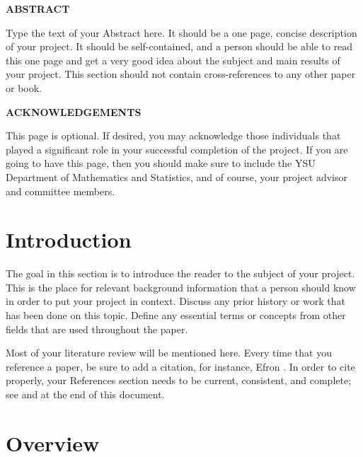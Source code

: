 \documentclass[11pt]{article}
\begin{document}
\newpage
{}
\setcounter{page}{2}
\begin{center}
\textbf{ABSTRACT} 
\end{center} \vspace{0.25in}

Type the text of your Abstract here.  It should be a one page, 
concise description of your project. It should be self-contained, 
and a person should be able to read this one page and get a very 
good idea about the subject and main results of your project. 
This section should not contain cross-references to any other 
paper or book. 

\newpage
\begin{center}
\textbf{ACKNOWLEDGEMENTS} 
\end{center} \vspace{0.25in}

This page is optional. If desired, you may acknowledge those 
individuals that played a significant role in your successful 
completion of the project. If you are going to have this page, 
then you should make sure to include the YSU Department of 
Mathematics and Statistics, and of course, your project advisor 
and committee members.

\newpage
\tableofcontents

\newpage
\section[Introduction]{Introduction}
\label{sec-1}

The goal in this section is to introduce the reader to the subject of
your project. This is the place for relevant background information
that a person should know in order to put your project in
context. Discuss any prior history or work that has been done on this
topic. Define any essential terms or concepts from other fields that
are used throughout the paper.

Most of your literature review will be mentioned here. Every time that
you reference a paper, be sure to add a citation, for instance, Efron
\cite{Efron1972}. In order to cite properly, your References section
needs to be current, consistent, and complete; see \cite{Cons} and
\cite{NoCopy} at the end of this document.

\newpage

\section[Overview]{Overview}
\label{sec-2}
\end{document}
